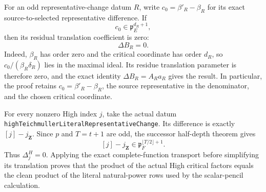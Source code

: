\begin{theorem}
\label{mod:cases-wildodd-affinetranslationbridge}
For an odd representative-change datum $R$, write
$c_0=\beta'_R-\beta_R$ for its exact source-to-selected representative
difference.  If
\[
 c_0\in\mathfrak p_E^{d_R+1},
\]
then its residual translation coefficient is zero:
\[
 \Delta B_R=0.
\]
Indeed, $\beta_R$ has order zero and the critical coordinate has order
$d_R$, so $c_0/(\beta_R\delta_R)$ lies in the maximal ideal.  Its residue
translation parameter is therefore zero, and the exact identity
$\Delta B_R=A_Ra_R$ gives the result.  In particular, the proof retains
$c_0=\beta'_R-\beta_R$, the source representative in the denominator, and
the chosen critical coordinate.

For every nonzero High index $j$, take the actual datum
\texttt{highTeichmullerLiteralRepresentativeChange}.  Its difference is
exactly $[j]-j_{\mathbf Z}$.  Since $p$ and $T=t+1$ are odd, the successor
half-depth theorem gives
\[
 [j]-j_{\mathbf Z}\in
 \mathfrak p_F^{\lfloor T/2\rfloor+1}.
\]
Thus $\Delta_j^H=0$.  Applying the exact complete-function transport before
simplifying its translation proves that the product of the actual High
critical factors equals the clean product of the literal natural-power rows
used by the scalar-pencil calculation.


\end{theorem}
